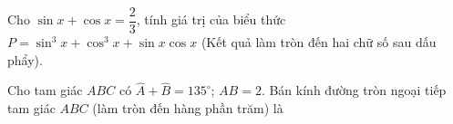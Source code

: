 \begin{ex}%
	Cho $\sin x+\cos x=\dfrac{2}{3}$, tính giá trị của biểu thức $P=\sin^3x+\cos^3x+\sin x \cos x$ (Kết quả làm tròn đến hai chữ số sau dấu phẩy).
	
\end{ex}
\begin{ex}%
Cho tam giác $ABC$ có $\widehat{A}+\widehat{B}=135^{\circ} $; $A B=2$. Bán kính đường tròn ngoại tiếp tam giác $ABC$ (làm tròn đến hàng phần trăm) là
\end{ex}
\TL
